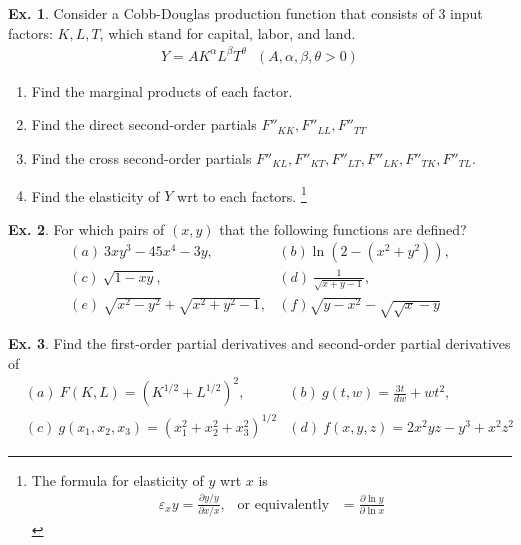 \documentclass[10pt,a4paper]{book}
\theoremstyle{definition}\newtheorem{definition}{Definition}
\theoremstyle{definition}\newtheorem{fact}{Fact}
\theoremstyle{definition}\newtheorem{ex}{Ex.}
\theoremstyle{definition}\newtheorem{project}{Project}
\theoremstyle{definition}\newtheorem{problem}{Problem}
\theoremstyle{definition}\newtheorem{example}{Example}
\numberwithin{theorem}{chapter}
\numberwithin{corollary}{chapter}
\numberwithin{assumption}{chapter}
\numberwithin{definition}{chapter}
\numberwithin{prop}{chapter}
\numberwithin{notation}{chapter}
\numberwithin{problem}{chapter}
\numberwithin{example}{chapter}
\numberwithin{fact}{chapter}
\numberwithin{ex}{chapter}
\begin{document}
	\begin{ex}
		Consider a Cobb-Douglas production function that consists of 3 input factors: $K, L, T$, which stand for capital, labor, and land.
		\begin{align}
			Y = A K^\alpha L^\beta T^\theta \ \ \ (A, \alpha,\beta,\theta >0) 
		\end{align}
		\begin{enumerate}
			\item Find the marginal products of each factor.
			\item Find the direct second-order partials $F''_{KK}, F''_{LL}, F''_{TT}$
			\item Find the cross second-order partials $F''_{KL}, F''_{KT}, F''_{LT}, F''_{LK}, F''_{TK}, F''_{TL}$.
			\item Find the elasticity of $Y$ wrt to each factors. \footnote{The formula for elasticity of $y$ wrt $x$ is 
				\begin{align*}
					\varepsilon_x y = \frac{\partial y / y}{\partial x/ x}, \ \ \text{ or equivalently } \ \ = \frac{\partial \ln y}{\partial \ln x} 
				\end{align*}
			}
		\end{enumerate}
	\end{ex}
	
	\begin{ex}
		For which pairs of $(x,y)$ that the following functions are defined?
		\begin{align*}
			& (a) \ 3 xy^3 - 45 x^4 - 3y, &(b) \ln(2-(x^2+y^2)), &                                        \\
			& (c)\ \sqrt{1-xy}, &(d) \ \frac{1}{\sqrt{x+y-1}}, &                                        \\
			& (e)\ \sqrt{x^2-y^2} + \sqrt{x^2+y^2-1}, &(f) \sqrt{y-x^2} - \sqrt{\sqrt{x} - y} &                                        
		\end{align*}
	\end{ex}
	
	\begin{ex}
		Find the first-order partial derivatives and second-order partial derivatives of
		\begin{align*}
			& (a) \ F(K, L) = (K^{1/2} + L^{1/2})^2,                 
			& (b) \ g(t,w) = \frac{3t}{dw} + w t^2,                  \\
			& (c) \ g(x_1, x_2, x_3) = (x_1^2 + x_2^2 + x_3^2)^{1/2} 
			& (d) \ f(x,y,z) = 2 x^2 yz - y^3 + x^2 z^2              
		\end{align*}
	\end{ex}
	
\end{document}

